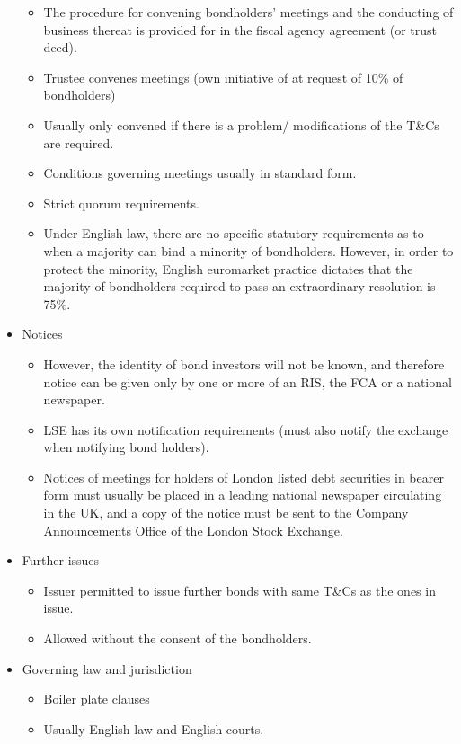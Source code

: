 \documentclass[
]{article}
\providecommand{\tightlist}{%
  \setlength{\itemsep}{0pt}\setlength{\parskip}{0pt}}
\begin{document}
\begin{itemize}
  \begin{itemize}
  \tightlist
  \item
    The procedure for convening bondholders' meetings and the conducting
    of business thereat is provided for in the fiscal agency agreement
    (or trust deed).
  \item
    Trustee convenes meetings (own initiative of at request of 10\% of
    bondholders)
  \item
    Usually only convened if there is a problem/ modifications of the
    T\&Cs are required.
  \item
    Conditions governing meetings usually in standard form.
  \item
    Strict quorum requirements.
  \item
    Under English law, there are no specific statutory requirements as
    to when a majority can bind a minority of bondholders. However, in
    order to protect the minority, English euromarket practice dictates
    that the majority of bondholders required to pass an extraordinary
    resolution is 75\%.
  \end{itemize}
\item
  Notices

  \begin{itemize}
  \tightlist
  \item
    However, the identity of bond investors will not be known, and
    therefore notice can be given only by one or more of an RIS, the FCA
    or a national newspaper.
  \item
    LSE has its own notification requirements (must also notify the
    exchange when notifying bond holders).
  \item
    Notices of meetings for holders of London listed debt securities in
    bearer form must usually be placed in a leading national newspaper
    circulating in the UK, and a copy of the notice must be sent to the
    Company Announcements Office of the London Stock Exchange.
  \end{itemize}
\item
  Further issues

  \begin{itemize}
  \tightlist
  \item
    Issuer permitted to issue further bonds with same T\&Cs as the ones
    in issue.
  \item
    Allowed without the consent of the bondholders.
  \end{itemize}
\item
  Governing law and jurisdiction

  \begin{itemize}
  \tightlist
  \item
    Boiler plate clauses
  \item
    Usually English law and English courts.
  \end{itemize}
\end{itemize}
\end{document}
